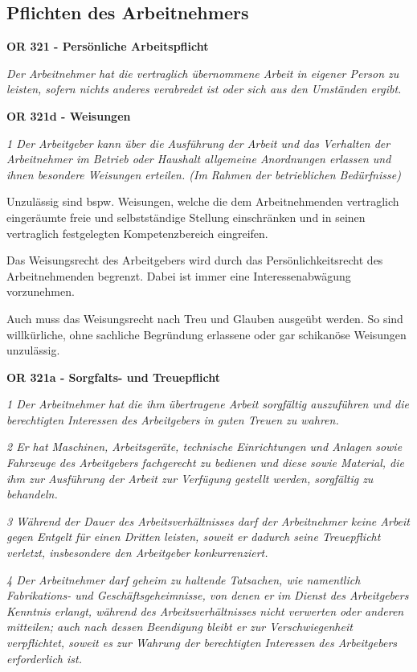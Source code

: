 \subsection{Pflichten des Arbeitnehmers}
\textbf{OR 321 - Persönliche Arbeitspflicht} 

\textit{Der Arbeitnehmer hat die vertraglich übernommene Arbeit in eigener Person zu leisten,
sofern nichts anderes verabredet ist oder sich aus den Umständen ergibt.}
\vspace{3mm}

\noindent
\textbf{OR 321d - Weisungen}

\textit{1 Der Arbeitgeber kann über die Ausführung der Arbeit und das Verhalten der Arbeitnehmer im Betrieb oder Haushalt allgemeine Anordnungen erlassen und ihnen besondere Weisungen erteilen. (Im Rahmen der betrieblichen Bedürfnisse)}

\noindent
Unzulässig sind bspw. Weisungen, welche die dem Arbeitnehmenden vertraglich eingeräumte
freie und selbstständige Stellung einschränken und in seinen vertraglich festgelegten
Kompetenzbereich eingreifen.

Das Weisungsrecht des Arbeitgebers wird durch das Persönlichkeitsrecht des Arbeitnehmenden
begrenzt. Dabei ist immer eine Interessenabwägung vorzunehmen.

Auch muss das Weisungsrecht nach Treu und Glauben ausgeübt werden. So sind willkürliche,
ohne sachliche Begründung erlassene oder gar schikanöse Weisungen unzulässig.
\vspace{3mm}

\noindent
\textbf{OR 321a - Sorgfalts- und Treuepflicht}

\textit{1 Der Arbeitnehmer hat die ihm übertragene Arbeit sorgfältig auszuführen und die berechtigten Interessen des Arbeitgebers in guten Treuen zu wahren.}

\textit{2 Er hat Maschinen, Arbeitsgeräte, technische Einrichtungen und Anlagen sowie Fahrzeuge des Arbeitgebers fachgerecht zu bedienen und diese sowie Material, die ihm zur Ausführung der Arbeit zur Verfügung gestellt werden, sorgfältig zu behandeln.}

\textit{3 Während der Dauer des Arbeitsverhältnisses darf der Arbeitnehmer keine Arbeit gegen Entgelt für einen Dritten leisten, soweit er dadurch seine Treuepflicht verletzt, insbesondere den Arbeitgeber konkurrenziert.}

\textit{4 Der Arbeitnehmer darf geheim zu haltende Tatsachen, wie namentlich Fabrikations- und Geschäftsgeheimnisse, von denen er im Dienst des Arbeitgebers Kenntnis erlangt, während des Arbeitsverhältnisses nicht verwerten oder anderen mitteilen; auch nach dessen Beendigung bleibt er zur Verschwiegenheit verpflichtet, soweit es zur Wahrung der berechtigten Interessen des Arbeitgebers erforderlich ist.}
\vspace{3mm}

